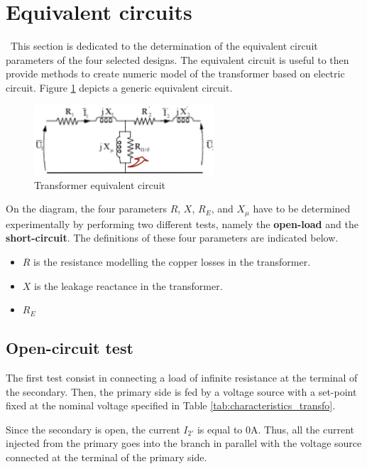 \documentclass[12pt,a4paper]{report}
\begin{document}
\section{Equivalent circuits}
\quad\, This section is dedicated to the determination of the equivalent circuit parameters of the four selected designs. The equivalent circuit is useful to then provide methods to create numeric model of the transformer based on electric circuit. Figure \ref{fig:equivalent_circuit} depicts a generic equivalent circuit.

 \begin{figure}[h]
    \centering
    \includegraphics[width=0.6\textwidth]{equivalent_circuit.PNG}
    \caption{Transformer equivalent circuit}
    \label{fig:equivalent_circuit}
\end{figure}

On the diagram, the four parameters $R$, $X$, $R_{E}$, and $X_\mu$ have to be determined experimentally by performing two different tests, namely the \textbf{open-load} and the \textbf{short-circuit}. The definitions of these four parameters are indicated below.
\begin{itemize}
    \item $R$ is the resistance modelling the copper losses in the transformer. 
    \item $X$ is the leakage reactance in the transformer.
    \item $R_E$
\end{itemize}
\subsection{Open-circuit test}
The first test consist in connecting a load of infinite resistance at the terminal of the secondary. Then, the primary side is fed by a voltage source with a set-point fixed at the nominal voltage specified in Table \ref{tab:characteristics_transfo}. 

Since the secondary is open, the current $I_{2'}$ is equal to 0A. Thus, all the current injected from the primary goes into the branch in parallel with the voltage source connected at the terminal of the primary side. 
\end{document}
